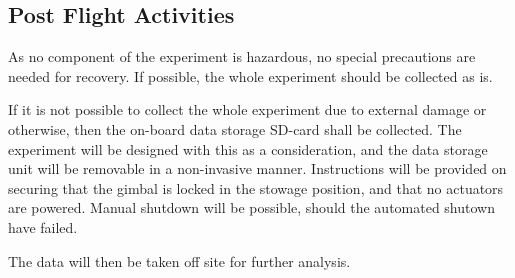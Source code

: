 \subsection{Post Flight Activities}
As no component of the experiment is hazardous, no special precautions are needed for recovery. If possible, the whole experiment should be collected as is.

If it is not possible to collect the whole experiment due to external damage or otherwise, then the on-board data storage SD-card shall be collected. The experiment will be designed with this as a consideration, and the data storage unit will be removable in a non-invasive manner. Instructions will be provided on securing that the gimbal is locked in the stowage position, and that no actuators are powered. Manual shutdown will be possible, should the automated shutown have failed.

The data will then be taken off site for further analysis. 




